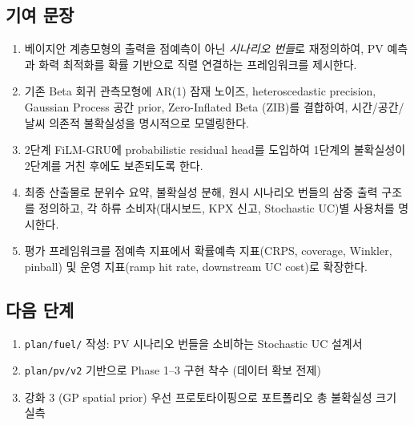 \documentclass[11pt,a4paper]{article}
\begin{document}
\subsection{기여 문장}
\begin{enumerate}[label=\textbf{C\arabic*.}, leftmargin=2.2em]
    \item 베이지안 계층모형의 출력을 점예측이 아닌 \emph{시나리오 번들}로 재정의하여, PV 예측과 화력 최적화를 확률 기반으로 직렬 연결하는 프레임워크를 제시한다.
    \item 기존 Beta 회귀 관측모형에 AR(1) 잠재 노이즈, heteroscedastic precision, Gaussian Process 공간 prior, Zero-Inflated Beta (ZIB)를 결합하여, 시간/공간/날씨 의존적 불확실성을 명시적으로 모델링한다.
    \item 2단계 FiLM-GRU에 probabilistic residual head를 도입하여 1단계의 불확실성이 2단계를 거친 후에도 보존되도록 한다.
    \item 최종 산출물로 분위수 요약, 불확실성 분해, 원시 시나리오 번들의 삼중 출력 구조를 정의하고, 각 하류 소비자(대시보드, KPX 신고, Stochastic UC)별 사용처를 명시한다.
    \item 평가 프레임워크를 점예측 지표에서 확률예측 지표(CRPS, coverage, Winkler, pinball) 및 운영 지표(ramp hit rate, downstream UC cost)로 확장한다.
\end{enumerate}

\subsection{다음 단계}

\begin{enumerate}[leftmargin=2em]
    \item \texttt{plan/fuel/} 작성: PV 시나리오 번들을 소비하는 Stochastic UC 설계서
    \item \texttt{plan/pv/v2} 기반으로 Phase 1--3 구현 착수 (데이터 확보 전제)
    \item 강화 3 (GP spatial prior) 우선 프로토타이핑으로 포트폴리오 총 불확실성 크기 실측
\end{enumerate}
\end{document}
